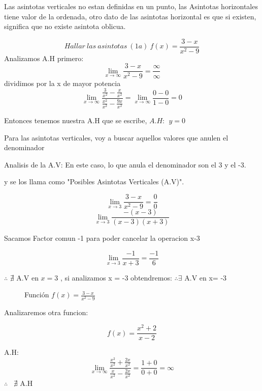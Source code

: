 \documentclass{article}
\begin{document}
Las asintotas verticales no estan definidas en un punto, las Asintotas horizontales tiene valor de la ordenada, otro dato
de las asintotas horizontal es que si existen, significa que no existe asintota oblicua.

$$ Hallar \ las \ asintotas \ (1a) \ f(x) = \frac{3-x}{x^2-9}$$
Analizamos A.H primero: 
$$ \lim_{x \to \infty} \frac{3-x}{x^2 - 9} = \frac{\infty}{\infty}$$
dividimos por la x de mayor potencia
$$ \lim_{x \to \infty} \frac{\frac{3}{x^2}-\frac{x}{x^2}}{\frac{x^2}{x^2}-\frac{9x}{x^2}} = \lim_{x \to \infty}\frac{0-0}{1-0} = 0$$

Entonces tenemos nuestra A.H que se escribe, $ A.H: \ \ y=0$

Para las asintotas verticales, voy a buscar aquellos valores que anulen el denominador

Analisis de la A.V:
En este caso, lo que anula el denominador son el 3 y el -3. 

y se los llama como "Posibles Asintotas Verticales (A.V)".

$$ \lim_{x \to 3} \frac{3-x}{x^2-9} = \frac{0}{0}$$
$$ \lim_{x \to 3} \frac{-(x-3)}{(x-3)(x+3)}$$

Sacamos Factor comun -1 para poder cancelar la operacion x-3

$$ \lim_{x \to 3 } \frac{-1}{x+3} = \frac{-1}{6} $$

$\therefore$ $\nexists$ A.V en $x=3$ , si analizamos x = -3 obtendremos: $\therefore$$\exists$ A.V en x= -3

\newpage

\begin{center}
\begin{figure}[h!]
    \center
    \caption{Funci\'on $f(x) = \frac{3-x}{x^2-9}$}
\end{figure}
\end{center}

Analizaremos otra funcion: 

$$ f(x)= \frac{x^2+2}{x-2}$$

A.H:
$$ \lim_{x \to \infty} \frac{\frac{x^2}{x^2}+\frac{2x}{x^2}}{\frac{x}{x^2}-\frac{2x}{x^2}}= \frac{1+0}{0+0} = \infty$$
$\therefore$ \ $\nexists$ A.H
\end{document}
